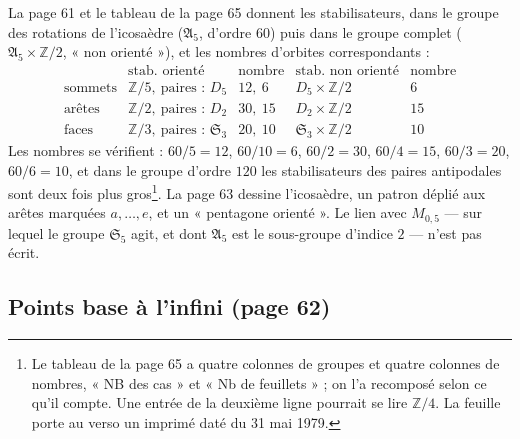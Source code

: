 \documentclass[11pt,a4paper]{article}
\begin{document}
La page 61 et le tableau de la page 65 donnent les stabilisateurs, dans le
groupe des rotations de l'icosaèdre ($\mathfrak{A}_5$, d'ordre $60$) puis dans
le groupe complet ($\mathfrak{A}_5 \times \mathbb{Z}/2$, « non orienté »), et
les nombres d'orbites correspondants :
\[
\begin{array}{l|cc|cc}
 & \text{stab.\ orienté} & \text{nombre} & \text{stab.\ non orienté} & \text{nombre}\\ \hline
\text{sommets} & \mathbb{Z}/5,\ \text{paires : } D_5 & 12,\ 6 & D_5 \times \mathbb{Z}/2 & 6\\
\text{arêtes} & \mathbb{Z}/2,\ \text{paires : } D_2 & 30,\ 15 & D_2 \times \mathbb{Z}/2 & 15\\
\text{faces} & \mathbb{Z}/3,\ \text{paires : } \mathfrak{S}_3 & 20,\ 10 & \mathfrak{S}_3 \times \mathbb{Z}/2 & 10
\end{array}
\]
Les nombres se vérifient : $60/5 = 12$, $60/10 = 6$, $60/2 = 30$, $60/4 = 15$,
$60/3 = 20$, $60/6 = 10$, et dans le groupe d'ordre $120$ les stabilisateurs
des paires antipodales sont deux fois plus gros\footnote{Le tableau de la page
65 a quatre colonnes de groupes et quatre colonnes de nombres, « NB des cas »
et « Nb de feuillets » ; on l'a recomposé selon ce qu'il compte. Une entrée de
la deuxième ligne pourrait se lire $\mathbb{Z}/4$. La feuille porte au verso un
imprimé daté du 31 mai 1979.}. La page 63 dessine l'icosaèdre, un patron
déplié aux arêtes marquées $a, \ldots, e$, et un « pentagone orienté ».
Le lien avec $M_{0,5}$ — sur lequel le groupe $\mathfrak{S}_5$ agit, et dont
$\mathfrak{A}_5$ est le sous-groupe d'indice $2$ — n'est pas écrit.

\subsection*{Points base à l'infini (page 62)}
\end{document}
